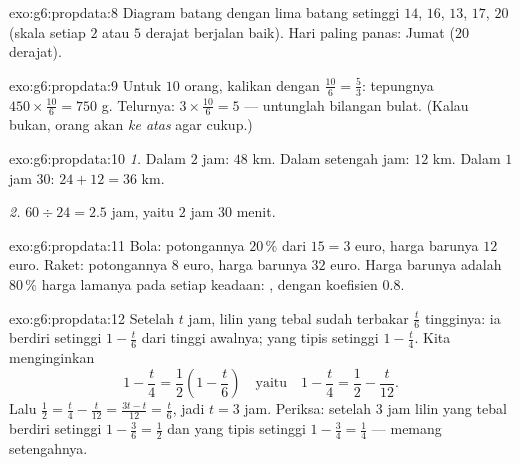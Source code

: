 \begin{solution}{exo:g6:propdata:8}
Diagram batang dengan lima batang setinggi $14$, $16$, $13$, $17$,
$20$ (skala setiap $2$ atau $5$ derajat berjalan baik). Hari paling
panas: Jumat ($20$ derajat).
\end{solution}

\begin{solution}{exo:g6:propdata:9}
Untuk $10$ orang, kalikan dengan $\frac{10}{6} = \frac53$: tepungnya
$450 \times \frac{10}{6} = 750$ g. Telurnya:
$3 \times \frac{10}{6} = 5$ --- untunglah bilangan bulat. (Kalau
bukan, orang akan  \emph{ke atas} agar cukup.)
\end{solution}

\begin{solution}{exo:g6:propdata:10}
\emph{1.} Dalam $2$ jam: $48$ km. Dalam setengah jam: $12$ km. Dalam
$1$ jam $30$: $24 + 12 = 36$ km.

\emph{2.} $60 \div 24 = 2.5$ jam, yaitu $2$ jam $30$ menit.
\end{solution}

\begin{solution}{exo:g6:propdata:11}
Bola: potongannya $20\,\%$ dari $15 = 3$ euro, harga barunya $12$
euro. Raket: potongannya $8$ euro, harga barunya $32$ euro. Harga
barunya adalah $80\,\%$ harga lamanya pada setiap keadaan: ,
dengan koefisien $0.8$.
\end{solution}

\begin{solution}{exo:g6:propdata:12}
Setelah $t$ jam, lilin yang tebal sudah terbakar $\frac t6$ tingginya:
ia berdiri setinggi $1 - \frac t6$ dari tinggi awalnya; yang tipis
setinggi $1 - \frac t4$. Kita menginginkan
\[
1 - \frac t4 = \frac12 \left(1 - \frac t6\right)
\quad\text{yaitu}\quad
1 - \frac t4 = \frac12 - \frac t{12}.
\]
Lalu $\frac12 = \frac t4 - \frac t{12} = \frac{3t - t}{12} =
\frac{t}{6}$, jadi $t = 3$ jam. Periksa: setelah $3$ jam lilin yang
tebal berdiri setinggi $1 - \frac36 = \frac12$ dan yang tipis setinggi
$1 - \frac34 = \frac14$ --- memang setengahnya.
\end{solution}

